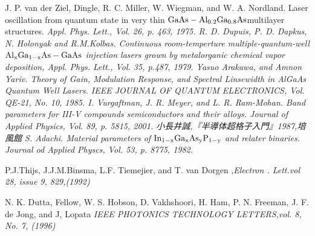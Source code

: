 \begin{thebibliography}{99}
 J. P. van der Ziel, Dingle, R. C. Miller, W. Wiegman, and W. A. Nordland. Laser oscillation from quantum state in very thin $\rm{GaAs-Al_{0.2}Ga_{0.8}As }$multilayer structures. \sl Appl. Phys. Lett.\rm , Vol. 26,  p. 463, 1975. 
 R. D. Dupuis, P. D. Dapkus, N. Holonyak and R.M.Kolbas. Continuous room-temperture multiple-quantum-well $\rm{Al_{x}Ga_{1-x}As-GaAs}$ injection lasers grown by metalorganic chemical vapor deposition, \sl  Appl. Phys. Lett.\rm , Vol. 35, p.487, 1979.
 Yasuo Arakawa, and Amnon Yariv. Theory of Gain, Modulation Response, and Spectral Linsewidth in AlGaAs Quantum Well Lasers. \sl IEEE JOURNAL OF QUANTUM ELECTRONICS\rm , Vol. QE-21, No. 10, 1985.
 I. Vurgaftman, J. R. Meyer, and L. R. Ram-Mohan. Band parameters for III-V compounds semiconductors and their alloys. \sl Journal of Applied Physics\rm , Vol. 89, p. 5815, 2001.
小長井誠,『半導体超格子入門』1987,培風館
 S. Adachi. Material parameters of $\rm{In_{1-x}Ga_{x}As_{y}P_{1-y}}$ and relater binaries. \sl Journal od Applied Physcs\rm , Vol. 53, p. 8775, 1982.

 P.J.Thijs, J.J.M.Binsma, L.F. Tiemejier, and T. van Dorgen ,\sl Electron . Lett.\rm vol 28, issue 9, 829,(1992)

N. K. Dutta, Fellow, W. S. Hobson, D. Vakhshoori, H. Ham, P. N. Freeman, J. F. de Jong, and J, Lopata \sl IEEE PHOTONICS TECHNOLOGY LETTERS\rm ,vol. 8, No. 7, (1996)











\end{thebibliography}
